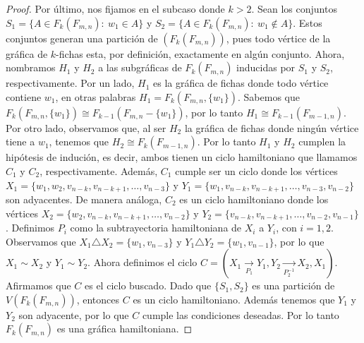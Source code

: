\begin{proof}
        Por \'ultimo, nos fijamos en el subcaso donde $k>2$. Sean los conjuntos
        $S_1=\{A \in F_k(F_{m,n}) \colon\ w_1 \in A\}$ y $S_2=\{A \in
        F_k(F_{m,n}) \colon\ w_1 \notin A\}$. Estos conjuntos generan una
        partici\'on de $(F_k(F_{m,n}))$, pues todo v\'ertice de la gr\'afica de
        $k$-fichas esta, por definici\'on, exactamente en alg\'un conjunto.
        Ahora, nombramos $H_1$ y $H_2$ a las subgr\'aficas de $F_k(F_{m,n})$
        inducidas por $S_1$ y $S_2$, respectivamente. Por un lado, $H_1$ es la
        gr\'afica de fichas donde todo v\'ertice contiene $w_1$, en otras
        palabras $H_1= F_k(F_{m,n},\{w_1\})$. Sabemos que $F_k(F_{m,n},\{w_1\})
        \cong F_{k-1}(F_{m,n}-\{w_1\})$, por lo tanto $H_1 \cong
        F_{k-1}(F_{m-1,n})$. Por otro lado, observamos que, al ser $H_2$ la
        gr\'afica de fichas donde ning\'un v\'ertice tiene a $w_1$, tenemos que
        $H_2 \cong F_k(F_{m-1,n})$. Por lo tanto $H_1$ y $H_2$ cumplen la
        hip\'otesis de induci\'on, es decir, ambos tienen un ciclo hamiltoniano
        que llamamos $C_1$ y $C_2$, respectivamente. Adem\'as, $C_1$ cumple ser
        un ciclo donde los v\'ertices $X_1 = \{w_1, w_2,v_{n-k},v_{n-k+1},
        \dots, v_{n-3}\}$ y $Y_1 = \{w_1,v_{n-k},v_{n-k+1}, \dots,
        v_{n-3},v_{n-2}\}$ son adyacentes. De manera an\'aloga, $C_2$ es un
        ciclo hamiltoniano donde los v\'ertices $X_2 = \{ w_2,v_{n-k},v_{n-k+1},
        \dots, v_{n-2}\}$ y $Y_2 = \{v_{n-k},v_{n-k+1}, \dots,
        v_{n-2},v_{n-1}\}$. Definimos $P_i$ como la subtrayectoria hamiltoniana
        de $X_i$ a $Y_i$, con $i =1,2$. Observamos que $X_1 \triangle X_2 =
        \{w_1,v_{n-3}\}$ y $Y_1 \triangle Y_2 = \{w_1, v_{n-1}\}$, por lo que
        $X_1 \sim X_2$ y $Y_1 \sim Y_2$. Ahora definimos el ciclo $C = (X_1
        \xrightarrow[P_1]{}Y_1,Y_2 \xrightarrow[P_2^{-1}]{}X_2,X_1)$. Afirmamos
        que $C$ es el ciclo buscado. Dado que $\{S_1,S_2\}$ es una partici\'on
        de $V(F_k(F_{m,n}))$, entonces $C$ es un ciclo hamiltoniano. Adem\'as
        tenemos que $Y_1$ y $Y_2$ son adyacente, por lo que $C$ cumple las
        condiciones deseadas. Por lo tanto $F_k(F_{m,n})$ es una gr\'afica
        hamiltoniana.
        \end{proof}